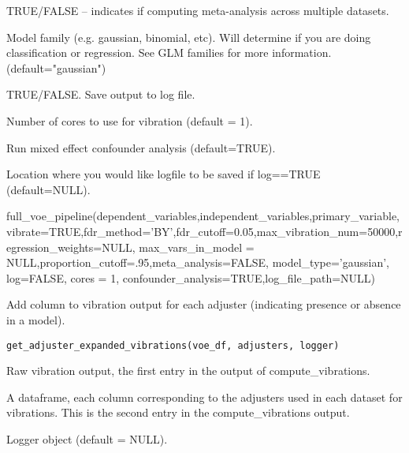 \documentclass[a4paper]{book}
\begin{document}
\begin{Arguments}
\begin{ldescription}
\item[\code{meta\_analysis}] TRUE/FALSE -- indicates if computing meta-analysis across multiple datasets.

\item[\code{model\_type}] Model family (e.g. gaussian, binomial, etc). Will determine if you are doing classification or regression. See GLM families for more information. (default="gaussian")

\item[\code{log}] TRUE/FALSE. Save output to log file.

\item[\code{cores}] Number of cores to use for vibration (default = 1).

\item[\code{confounder\_analysis}] Run mixed effect confounder analysis (default=TRUE).

\item[\code{log\_file\_path}] Location where you would like logfile to be saved if log==TRUE (default=NULL).
\end{ldescription}
\end{Arguments}
%
\begin{Examples}
\begin{ExampleCode}
full_voe_pipeline(dependent_variables,independent_variables,primary_variable,vibrate=TRUE,fdr_method='BY',fdr_cutoff=0.05,max_vibration_num=50000,regression_weights=NULL, max_vars_in_model = NULL,proportion_cutoff=.95,meta_analysis=FALSE, model_type='gaussian', log=FALSE, cores = 1, confounder_analysis=TRUE,log_file_path=NULL)
\end{ExampleCode}
\end{Examples}
%
\begin{Description}\relax
Add column to vibration output for each adjuster (indicating presence or absence in a model).
\end{Description}
%
\begin{Usage}
\begin{verbatim}
get_adjuster_expanded_vibrations(voe_df, adjusters, logger)
\end{verbatim}
\end{Usage}
%
\begin{Arguments}
\begin{ldescription}
\item[\code{voe\_df}] Raw vibration output, the first entry in the output of compute\_vibrations.

\item[\code{adjusters}] A dataframe, each column corresponding to the adjusters used in each dataset for vibrations. This is the second entry in the compute\_vibrations output.

\item[\code{logger}] Logger object (default = NULL).
\end{ldescription}
\end{Arguments}
\end{document}
